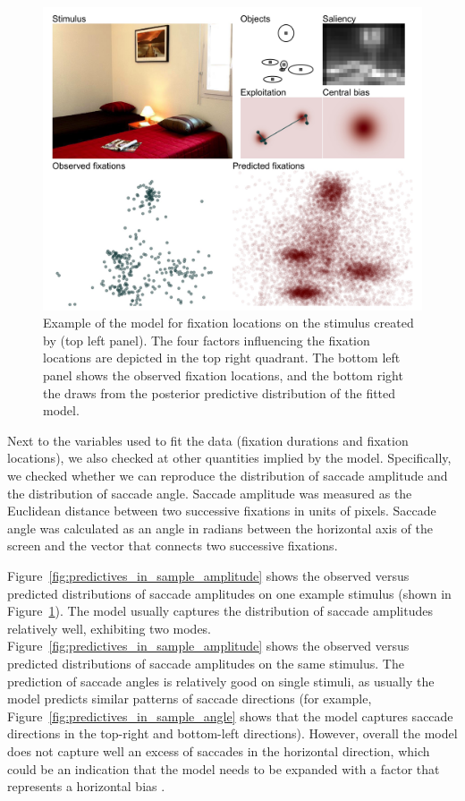 \documentclass{article}
\begin{document}
\begin{figure}
    \centering
    \includegraphics[width=\textwidth]{figures/fit_model/in_sample/xy/1251.jpg}
    \caption{Example of the model for fixation locations on the stimulus created by \citet{xu2014beyond} (top left panel). The four factors influencing the fixation locations are depicted in the top right quadrant. The bottom left panel shows the observed fixation locations, and the bottom right the draws from the posterior predictive distribution of the fitted model.}
    \label{fig:predictives_in_sample_xy}
\end{figure}

Next to the variables used to fit the data (fixation durations and fixation locations), we also checked at other quantities implied by the model. Specifically, we checked whether we can reproduce the distribution of saccade amplitude and the distribution of saccade angle.  Saccade amplitude was measured as the Euclidean distance between two successive fixations in units of pixels. Saccade angle was calculated as an angle in radians between the horizontal axis of the screen and the vector that connects two successive fixations.

Figure~\ref{fig:predictives_in_sample_amplitude} shows the observed versus predicted distributions of saccade amplitudes on one example stimulus (shown in Figure~\ref{fig:predictives_in_sample_xy}). The model usually captures the distribution of saccade amplitudes relatively well, exhibiting two modes. Figure~\ref{fig:predictives_in_sample_amplitude} shows the observed versus predicted distributions of saccade amplitudes on the same stimulus. The prediction of saccade angles is relatively good on single stimuli, as usually the model predicts similar patterns of saccade directions (for example, Figure~\ref{fig:predictives_in_sample_angle} shows that the model captures saccade directions in the top-right and bottom-left directions). However, overall the model does not capture well an excess of saccades in the horizontal direction, which could be an indication that the model needs to be expanded with a factor that represents a horizontal bias \citep{renswoude2016horizontal}.
\end{document}
